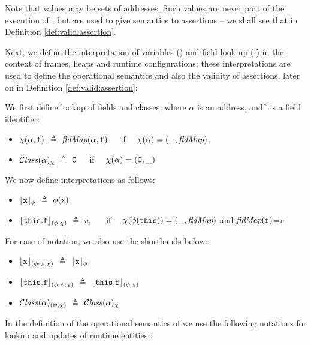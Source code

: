 Note that values may be sets of addresses. Such values are never part of the execution of \LangOO, but are used to give semantics to assertions -- we shall see that in Definition \ref{def:valid:assertion}.



Next, we define the interpretation of variables (\x) and   field look up  (\this.\f)
in the context of frames,
heaps and runtime configurations; these interpretations are used to define the operational semantics and  also  the
validity of assertions, later on in Definition \ref{def:valid:assertion}:

\begin{definition}[Interpretations]
We first define lookup of fields and classes, where $\alpha$ is an address, and \f\, is a field identifier:
\begin{itemize}
\item
$\chi ({\alpha},{{\mbox{\tt{f}}}})$ $\triangleq$  $\textit{fldMap}({\alpha},{{\mbox{\tt{f}}}})$\ \ \ if \ \ $\chi(\alpha)=(\_, \textit{fldMap})$.
\item
${\mathcal C}{\mathit{lass}}(\alpha)_{\chi} $ $\triangleq$ ${\mbox{\tt{C}}}$\  \ \ if \ \ $\chi(\alpha)=({\mbox{\tt{C}}},\_)$
\end{itemize}

\noindent
We now define interpretations  as follows:

\begin{itemize}
\item
${\lfloor{ {{\mbox{\tt{x}}}}}\rfloor_{\phi}} $ $\triangleq$ $\phi({\mbox{\tt{x}}})$
\item
${\lfloor{ {{\mbox{\tt{this}}}.{\mbox{\tt{f}}}}}\rfloor_{(\phi,\chi)}} $ $\triangleq$ $v$, \ \ \ if \ \ $\chi(\phi({\mbox{\tt{this}}}))=(\_, \textit{fldMap})$ and $\textit{fldMap}({\mbox{\tt{f}}})$=$v$

\end{itemize}

\noindent
For ease of notation, we also use the shorthands below:
\begin{itemize}
\item
${\lfloor{ {{\mbox{\tt{x}}}}}\rfloor_{(\phi\cdot\psi,\chi)}} $ $\triangleq$ ${\lfloor{ {{\mbox{\tt{x}}}}}\rfloor_{\phi}} $
\item
${\lfloor{ {{\mbox{\tt{this}}}.{\mbox{\tt{f}}}}}\rfloor_{(\phi\cdot\psi,\chi)}} $ $\triangleq$ ${\lfloor{ {{\mbox{\tt{this}}}.{\mbox{\tt{f}}}}}\rfloor_{(\phi,\chi)}} $
\item
${\mathcal C}{\mathit{lass}}(\alpha)_{(\psi,\chi)} $ $\triangleq$ ${\mathcal C}{\mathit{lass}}(\alpha)_{\chi} $
\end{itemize}

\end{definition}

In the definition of the operational semantics of \LangOO we use the following notations for lookup and updates of runtime entities :

